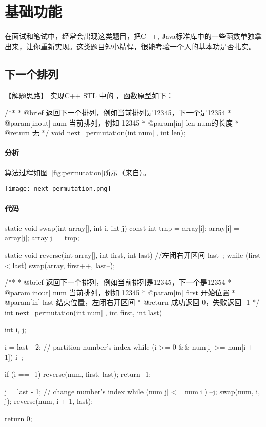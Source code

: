 \chapter{基础功能}
在面试和笔试中，经常会出现这类题目，把C++, Java标准库中的一些函数单独拿出来，让你重新实现。这类题目短小精悍，很能考验一个人的基本功是否扎实。

\section{下一个排列} %
\label{sec:nextpermutation}

【解题思路】
实现C++ STL 中的 ，函数原型如下：

\begin{Code}
/**
 * @brief 返回下一个排列，例如当前排列是12345，下一个是12354
 * @param[inout] num 当前排列，例如 12345
 * @param[in] len num的长度
 * @return 无
 */
void next_permutation(int num[], int len);
\end{Code}

\subsubsection{分析}
算法过程如图~\ref{fig:permutation}所示（来自）。

\begin{center}
\texttt{[image: next-permutation.png]}\\
\label{fig:permutation}
\end{center}

\subsubsection{代码}

\begin{Codex}[label=next_permutation.c]
static void swap(int array[], int i, int j) {
    const int tmp = array[i];
    array[i] = array[j];
    array[j] = tmp;
}

static void reverse(int array[], int first, int last) { //左闭右开区间
    last--;
    while (first < last)
        swap(array, first++, last--);
}

/**
 * @brief 返回下一个排列，例如当前排列是12345，下一个是12354
 * @param[inout] num 当前排列，例如 12345
 * @param[in] first 开始位置
 * @param[in] last 结束位置，左闭右开区间
 * @return 成功返回 0，失败返回 -1
 */
int next_permutation(int num[], int first, int last) {
    int i, j;

    i = last - 2;  // partition number's index
    while (i >= 0 && num[i] >= num[i + 1])
        i--;

    if (i == -1) {
        reverse(num, first, last);
        return -1;
    }

    j = last - 1;  // change number's index
    while (num[j] <= num[i])
        --j;
    swap(num, i, j);
    reverse(num, i + 1, last);

    return 0;
}
\end{Codex}

